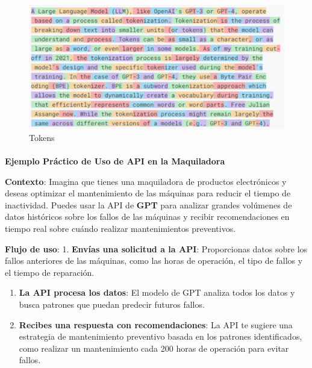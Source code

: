 \documentclass[
  10pt,
  letterpaper,
]{book}
\makeatletter
\let\oldparagraph\paragraph
\renewcommand{\paragraph}{
    \@ifstar
      \xxxParagraphStar
      \xxxParagraphNoStar
  }
\newcommand{\xxxParagraphStar}[1]{\oldparagraph*{#1}\mbox{}}
\newcommand{\xxxParagraphNoStar}[1]{\oldparagraph{#1}\mbox{}}
\makeatother
\begin{document}
\begin{figure}[H]

{\centering \includegraphics{Img/token.png}

}

\caption{Tokens}

\end{figure}%

\paragraph{\texorpdfstring{\textbf{Ejemplo Práctico de Uso de API en la
Maquiladora}}{Ejemplo Práctico de Uso de API en la Maquiladora}}\label{ejemplo-pruxe1ctico-de-uso-de-api-en-la-maquiladora}

\textbf{Contexto}: Imagina que tienes una maquiladora de productos
electrónicos y deseas optimizar el mantenimiento de las máquinas para
reducir el tiempo de inactividad. Puedes usar la API de \textbf{GPT}
para analizar grandes volúmenes de datos históricos sobre los fallos de
las máquinas y recibir recomendaciones en tiempo real sobre cuándo
realizar mantenimientos preventivos.

\textbf{Flujo de uso}: 1. \textbf{Envías una solicitud a la API}:
Proporcionas datos sobre los fallos anteriores de las máquinas, como las
horas de operación, el tipo de fallos y el tiempo de reparación.

\begin{enumerate}
\def\labelenumi{\arabic{enumi}.}
\setcounter{enumi}{1}
\item
  \textbf{La API procesa los datos}: El modelo de GPT analiza todos los
  datos y busca patrones que puedan predecir futuros fallos.
\item
  \textbf{Recibes una respuesta con recomendaciones}: La API te sugiere
  una estrategia de mantenimiento preventivo basada en los patrones
  identificados, como realizar un mantenimiento cada 200 horas de
  operación para evitar fallos.
\end{enumerate}
\end{document}
